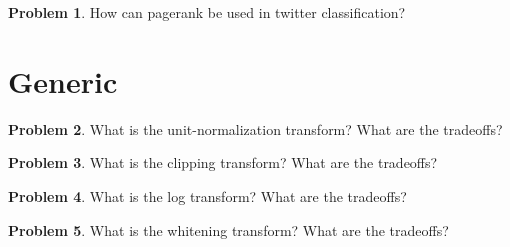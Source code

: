 \documentclass[10pt]{article}
\theoremstyle{definition}
\newtheorem{problem}{Problem}
\begin{document}
\newpage
\begin{problem}
    How can pagerank be used in twitter classification?
\end{problem}


\newpage
\section{Generic}
\begin{problem}
    What is the unit-normalization transform?
    What are the tradeoffs?
\end{problem}

\newpage
\begin{problem}
    What is the clipping transform?
    What are the tradeoffs?
\end{problem}

\newpage
\begin{problem}
    What is the log transform?
    What are the tradeoffs?
\end{problem}

\newpage
\newpage
\begin{problem}
    What is the whitening transform?
    What are the tradeoffs?
\end{problem}
\end{document}
